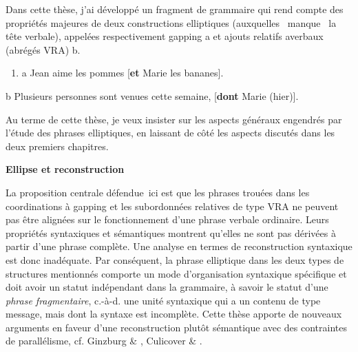 Dans cette thèse, j'ai développé un fragment de grammaire qui rend compte des propriétés majeures de deux constructions elliptiques (auxquelles {\guillemotleft}~manque~{\guillemotright} la tête verbale), appelées respectivement gapping a et ajouts relatifs averbaux (abrégés VRA) b.


\begin{enumerate}
\item \label{bkm:Ref307390740}a  Jean aime les pommes [\textbf{et} Marie les bananes]. 


\end{enumerate}
  b  Plusieurs personnes sont venues cette semaine, [\textbf{dont} Marie (hier)].

Au terme de cette thèse, je veux insister sur les aspects généraux engendrés par l'étude des phrases elliptiques, en laissant de côté les aspects discutés dans les deux premiers chapitres.  

{\bfseries
Ellipse et reconstruction}

La proposition centrale défendue~ici est que les phrases trouées dans les coordinations à gapping et les subordonnées relatives de type VRA ne peuvent pas être alignées sur le fonctionnement d'une phrase verbale ordinaire. Leurs propriétés syntaxiques et sémantiques montrent qu'elles ne sont pas dérivées à partir d'une phrase complète. Une analyse en termes de reconstruction syntaxique est donc inadéquate. Par conséquent, la phrase elliptique dans les deux types de structures mentionnés comporte un mode d'organisation syntaxique spécifique et doit avoir un statut indépendant dans la grammaire, à savoir le statut d'une \textit{phrase fragmentaire}, c.-à-d. une unité syntaxique qui a un contenu de type message, mais dont la syntaxe est incomplète. Cette thèse apporte de nouveaux arguments en faveur d'une reconstruction plutôt sémantique avec des contraintes de parallélisme, cf. Ginzburg \& \citet{Sag2000}, Culicover \& \citet{Jackendoff2005}.

